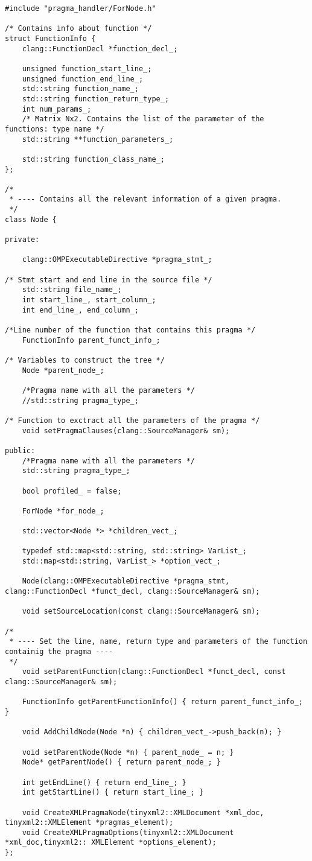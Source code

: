 \documentclass[a4paper,11pt,twoside]{book}
\begin{document}
\begin{lstlisting}[language=CCC, caption=pragma\_handler/Node.h]
#include "pragma_handler/ForNode.h"

/* Contains info about function */
struct FunctionInfo {
	clang::FunctionDecl *function_decl_;

	unsigned function_start_line_;
	unsigned function_end_line_;
	std::string function_name_;
	std::string function_return_type_;
	int num_params_;
	/* Matrix Nx2. Contains the list of the parameter of the functions: type name */
	std::string **function_parameters_;

	std::string function_class_name_;
};

/*
 * ---- Contains all the relevant information of a given pragma.
 */
class Node {

private:

	clang::OMPExecutableDirective *pragma_stmt_;

/* Stmt start and end line in the source file */
	std::string file_name_;
	int start_line_, start_column_;
	int end_line_, end_column_;

/*Line number of the function that contains this pragma */
	FunctionInfo parent_funct_info_;

/* Variables to construct the tree */
	Node *parent_node_;

	/*Pragma name with all the parameters */
	//std::string pragma_type_;

/* Function to exctract all the parameters of the pragma */
	void setPragmaClauses(clang::SourceManager& sm);

public:
	/*Pragma name with all the parameters */
	std::string pragma_type_;

	bool profiled_ = false;

	ForNode *for_node_;

	std::vector<Node *> *children_vect_;

	typedef std::map<std::string, std::string> VarList_;
	std::map<std::string, VarList_> *option_vect_;

	Node(clang::OMPExecutableDirective *pragma_stmt, clang::FunctionDecl *funct_decl, clang::SourceManager& sm);

	void setSourceLocation(const clang::SourceManager& sm);

/*
 * ---- Set the line, name, return type and parameters of the function containig the pragma ----
 */
	void setParentFunction(clang::FunctionDecl *funct_decl, const clang::SourceManager& sm);

	FunctionInfo getParentFunctionInfo() { return parent_funct_info_; }

	void AddChildNode(Node *n) { children_vect_->push_back(n); }

	void setParentNode(Node *n) { parent_node_ = n; }
	Node* getParentNode() { return parent_node_; }

	int getEndLine() { return end_line_; }
	int getStartLine() { return start_line_; }

	void CreateXMLPragmaNode(tinyxml2::XMLDocument *xml_doc, tinyxml2::XMLElement *pragmas_element);
	void CreateXMLPragmaOptions(tinyxml2::XMLDocument *xml_doc,tinyxml2:: XMLElement *options_element);
};
\end{lstlisting}
\end{document}
